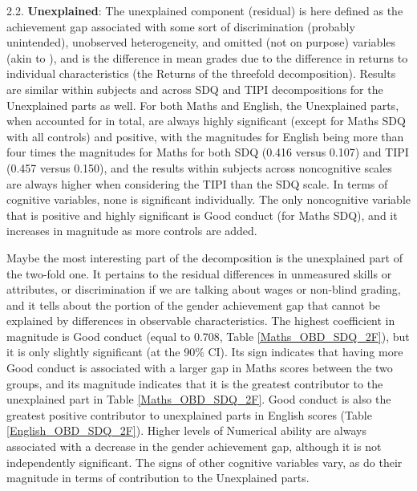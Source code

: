 \documentclass[12pt,a4paper,onecolumn]{article}
\numberwithin{equation}{section}
\begin{document}
2.2. \textbf{Unexplained}: The unexplained component (residual) is here defined as the achievement gap associated with some sort of discrimination (probably unintended), unobserved heterogeneity, and omitted (not on purpose) variables (akin to \parencite{popli2013}), and is the difference in mean grades due to the difference in returns to individual characteristics (the Returns of the threefold decomposition). Results are similar within subjects and across SDQ and TIPI decompositions for the Unexplained parts as well. For both Maths and English, the Unexplained parts, when accounted for in total, are always highly significant (except for Maths SDQ with all controls) and positive, with the magnitudes for English being more than four times the magnitudes for Maths for both SDQ (0.416 versus 0.107) and TIPI (0.457 versus 0.150), and the results within subjects across noncognitive scales are always higher when considering the TIPI than the SDQ scale. In terms of cognitive variables, none is significant individually. The only noncognitive variable that is positive and highly significant is Good conduct (for Maths SDQ), and it increases in magnitude as more controls are added.

Maybe the most interesting part of the decomposition is the unexplained part of the two-fold one. It pertains to the residual differences in unmeasured skills or attributes, or discrimination if we are talking about wages or non-blind grading, and it tells about the portion of the gender achievement gap that cannot be explained by differences in observable characteristics. The highest coefficient in magnitude is Good conduct (equal to 0.708, Table \ref{Maths_OBD_SDQ_2F}), but it is only slightly significant (at the 90\% CI). Its sign indicates that having more Good conduct is associated with a larger gap in Maths scores between the two groups, and its magnitude indicates that it is the greatest contributor to the unexplained part in Table \ref{Maths_OBD_SDQ_2F}. 
Good conduct is also the greatest positive contributor to unexplained parts in English scores (Table \ref{English_OBD_SDQ_2F}). Higher levels of Numerical ability are always associated with a decrease in the gender achievement gap, although it is not independently significant. The signs of other cognitive variables vary, as do their magnitude in terms of contribution to the Unexplained parts.
\end{document}
